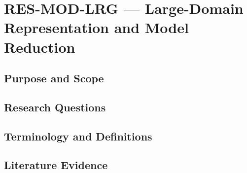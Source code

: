 
\section{RES-MOD-LRG --- Large-Domain Representation and Model Reduction}
\label{sec:res-mod-lrg}

\subsection{Purpose and Scope}
\label{sec:res-mod-lrg-purpose}


\subsection{Research Questions}
\label{sec:res-mod-lrg-research-questions}


\subsection{Terminology and Definitions}
\label{sec:res-mod-lrg-definitions}


\subsection{Literature Evidence}
\label{sec:res-mod-lrg-literature-evidence}

%

